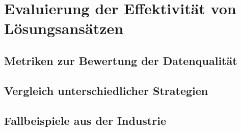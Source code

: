 \section{Evaluierung der Effektivität von Lösungsansätzen}\label{sec:evaluierung}

\subsection{Metriken zur Bewertung der Datenqualität}\label{sec:evaluierung-metrix}

\subsection{Vergleich unterschiedlicher Strategien}\label{sec:evaluierung-comparsion}

\subsection{Fallbeispiele aus der Industrie}\label{sec:evaluierung-examples}

